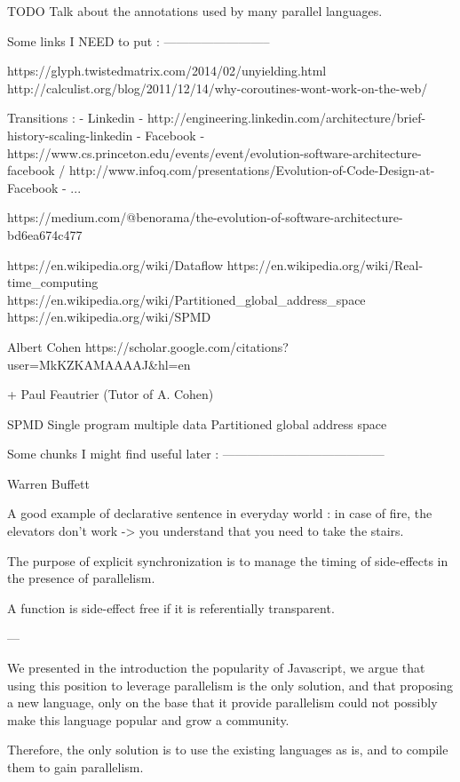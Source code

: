 


TODO Talk about the annotations used by many parallel languages.



Some links I NEED to put :
--------------------------

https://glyph.twistedmatrix.com/2014/02/unyielding.html
http://calculist.org/blog/2011/12/14/why-coroutines-wont-work-on-the-web/

Transitions :
  - Linkedin - http://engineering.linkedin.com/architecture/brief-history-scaling-linkedin
  - Facebook - https://www.cs.princeton.edu/events/event/evolution-software-architecture-facebook / http://www.infoq.com/presentations/Evolution-of-Code-Design-at-Facebook
  - ... 

https://medium.com/@benorama/the-evolution-of-software-architecture-bd6ea674c477

https://en.wikipedia.org/wiki/Dataflow
https://en.wikipedia.org/wiki/Real-time_computing
https://en.wikipedia.org/wiki/Partitioned_global_address_space
https://en.wikipedia.org/wiki/SPMD

Albert Cohen
https://scholar.google.com/citations?user=MkKZKAMAAAAJ&hl=en

+ Paul Feautrier (Tutor of A. Cohen)


SPMD Single program multiple data
Partitioned global address space


Some chunks I might find useful later :
---------------------------------------

{Warren Buffett}

A good example of declarative sentence in everyday world : in case of fire, 
the elevators don't work -> you understand that you need to take the stairs.

The purpose of explicit synchronization is to manage the timing of side-effects in the presence of parallelism. 

A function is side-effect free if it is referentially transparent.



---


We presented in the introduction the popularity of Javascript, we argue that using this position to leverage parallelism is the only solution, and that proposing a new language, only on the base that it provide parallelism could not possibly make this language popular and grow a community.

Therefore, the only solution is to use the existing languages as is, and to compile them to gain parallelism.